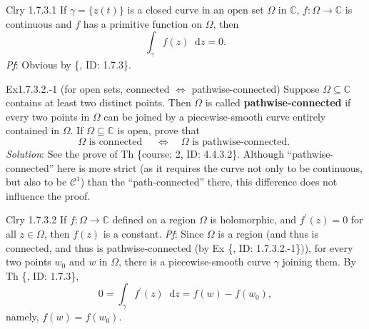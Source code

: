 \documentclass{article}
\newcommand{\dif}{\mathop{}\!\mathrm{d}}
\begin{document}
\begin{Th}{Clry 1.7.3.1}
    If $\gamma = \{z(t)\}$ is a closed curve in an open set $\varOmega$ in $\mathbb{C}$, $f: \varOmega\to\mathbb{C}$ is continuous and $f$ has a primitive function on $\varOmega$, then
    $$ \int_{\gamma}f(z)\dif z = 0. $$
    \tcblower
    \textit{Pf}: Obvious by \{, ID: 1.7.3\}.
\end{Th}

\begin{Th}{Ex1.7.3.2.-1 (for open sets, connected $\Leftrightarrow$ pathwise-connected)}
    \textcolor{Df}{Suppose $\varOmega\subseteq\mathbb{C}$ contains at least two distinct points. Then $\varOmega$ is called \textbf{pathwise-connected} if every two points in $\varOmega$ can be joined by a piecewise-smooth curve entirely contained in $\varOmega$.} If $\varOmega\subseteq\mathbb{C}$ is open, prove that 
    $$\varOmega \text{ is connected } \quad\Leftrightarrow\quad \varOmega \text{ is pathwise-connected. }$$
    \tcblower
    \textit{Solution}: See the prove of Th \{course: 2, ID: 4.4.3.2\}. Although ``pathwise-connected'' here is more strict (as it requires the curve not only to be  continuous, but also to be $\mathcal{C}^1$) than the ``path-connected'' there, this difference does not influence the proof.
\end{Th}

\begin{Th}{Clry 1.7.3.2}
    If $f: \varOmega\to\mathbb{C}$ defined on a region $\varOmega$ is holomorphic, and $f^\prime (z) = 0$ for all $z\in\varOmega$, then $f(z)$ is a constant.
    \tcblower
    \textit{Pf}: Since $\varOmega$ is a region (and thus is connected, and thus is pathwise-connected (by Ex \{, ID: 1.7.3.2.-1\})), for every two points $w_0$ and $w$ in $\varOmega$, there is a piecewise-smooth curve $\gamma$ joining them. By Th \{, ID: 1.7.3\},
    $$ 0 = \int_\gamma f^\prime (z) \dif z = f(w) - f(w_0), $$
    namely, $f(w) = f(w_0)$.
\end{Th}
\end{document}
